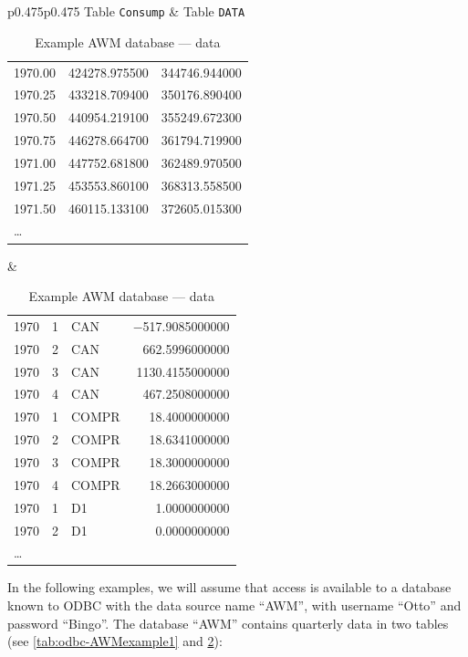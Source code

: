 \begin{table}[htbp]
  \centering
  \begin{tabular}{p{}p{}}
  Table \texttt{Consump} &
  Table \texttt{DATA} \\
    
\begin{tabular}{lll}
  1970.00	& 424278.975500	& 344746.944000 \\ 
  1970.25	& 433218.709400	& 350176.890400 \\ 
  1970.50	& 440954.219100	& 355249.672300 \\ 
  1970.75	& 446278.664700	& 361794.719900 \\ 
  1971.00	& 447752.681800	& 362489.970500 \\ 
  1971.25	& 453553.860100	& 368313.558500 \\ 
  1971.50	& 460115.133100	& 372605.015300 \\ 
\ldots \\ 
\end{tabular} &

\begin{tabular}{lllr}
1970	& 1	& CAN	& $-$517.9085000000\\ 
1970	& 2	& CAN	& 662.5996000000 \\ 
1970	& 3	& CAN	& 1130.4155000000\\ 
1970	& 4	& CAN	& 467.2508000000 \\ 
1970	& 1	& COMPR	& 18.4000000000  \\ 
1970	& 2	& COMPR	& 18.6341000000  \\ 
1970	& 3	& COMPR	& 18.3000000000  \\ 
1970	& 4	& COMPR	& 18.2663000000  \\ 
1970	& 1	& D1	& 1.0000000000   \\ 
1970	& 2	& D1	& 0.0000000000   \\ 
\ldots \\ 
\end{tabular}
\end{tabular}
  \caption{Example AWM database --- data}
  \label{tab:odbc-AWMexample2}
\end{table}

In the following examples, we will assume that access is available to
a database known to ODBC with the data source name ``AWM'', with
username ``Otto'' and password ``Bingo''. The database ``AWM''
contains quarterly data in two tables (see \ref{tab:odbc-AWMexample1}
and \ref{tab:odbc-AWMexample2}):

